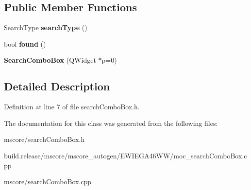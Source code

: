 \subsection*{Public Member Functions}
\begin{DoxyCompactItemize}
\item 
\mbox{\label{class_ms_1_1_search_combo_box_af85bc6e349c35462368ee61021e0e85e}} 
Search\+Type {\bfseries search\+Type} ()
\item 
\mbox{\label{class_ms_1_1_search_combo_box_a5f8eeac7b67eaded2865b81b1d46910d}} 
bool {\bfseries found} ()
\item 
\mbox{\label{class_ms_1_1_search_combo_box_a13df8f4cb3096fe9d46eda0b6b20b285}} 
{\bfseries Search\+Combo\+Box} (Q\+Widget $\ast$p=0)
\end{DoxyCompactItemize}


\subsection{Detailed Description}


Definition at line 7 of file search\+Combo\+Box.\+h.



The documentation for this class was generated from the following files\+:\begin{DoxyCompactItemize}
\item 
mscore/search\+Combo\+Box.\+h\item 
build.\+release/mscore/mscore\+\_\+autogen/\+E\+W\+I\+E\+G\+A46\+W\+W/moc\+\_\+search\+Combo\+Box.\+cpp\item 
mscore/search\+Combo\+Box.\+cpp\end{DoxyCompactItemize}
